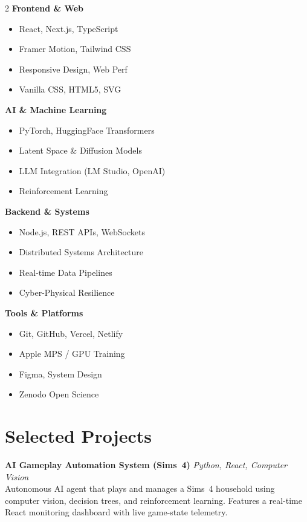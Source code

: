 \documentclass[11pt, letterpaper]{article}
\begin{document}
\begin{multicols}{2}
\textbf{Frontend \& Web}
\begin{itemize}[leftmargin=15pt, itemsep=1pt]
  \item React, Next.js, TypeScript
  \item Framer Motion, Tailwind CSS
  \item Responsive Design, Web Perf
  \item Vanilla CSS, HTML5, SVG
\end{itemize}

\textbf{AI \& Machine Learning}
\begin{itemize}[leftmargin=15pt, itemsep=1pt]
  \item PyTorch, HuggingFace Transformers
  \item Latent Space \& Diffusion Models
  \item LLM Integration (LM Studio, OpenAI)
  \item Reinforcement Learning
\end{itemize}

\textbf{Backend \& Systems}
\begin{itemize}[leftmargin=15pt, itemsep=1pt]
  \item Node.js, REST APIs, WebSockets
  \item Distributed Systems Architecture
  \item Real-time Data Pipelines
  \item Cyber-Physical Resilience
\end{itemize}

\textbf{Tools \& Platforms}
\begin{itemize}[leftmargin=15pt, itemsep=1pt]
  \item Git, GitHub, Vercel, Netlify
  \item Apple MPS / GPU Training
  \item Figma, System Design
  \item Zenodo Open Science
\end{itemize}
\end{multicols}

\section{Selected Projects}

\textbf{AI Gameplay Automation System (Sims~4)} \hfill \textit{Python, React, Computer Vision} \\
Autonomous AI agent that plays and manages a Sims~4 household using computer vision, decision trees, and reinforcement learning. Features a real-time React monitoring dashboard with live game-state telemetry. \\[4pt]
\end{document}
